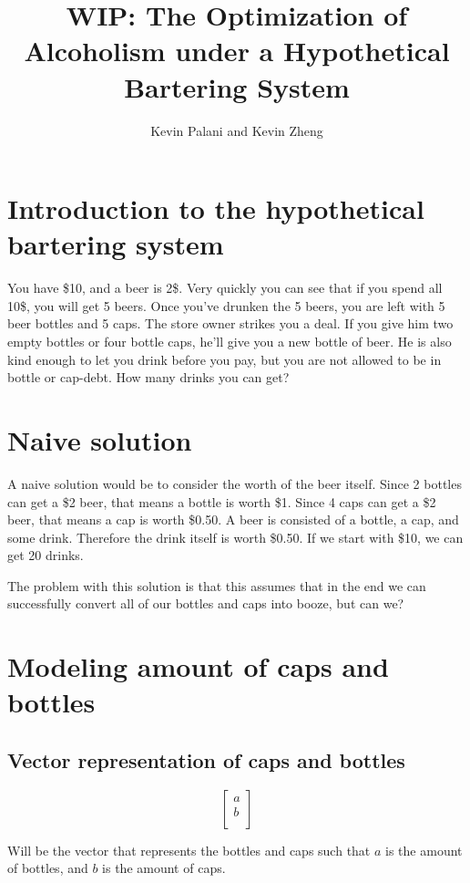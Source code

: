 \documentclass[letterpaper, 12pt]{article}
\title{WIP: The Optimization of Alcoholism under a Hypothetical Bartering System}
\author{Kevin Palani and Kevin Zheng}
\begin{document}
\maketitle
\tableofcontents
\lstset{
    breaklines=true
}
\section{Introduction to the hypothetical bartering system}
\par You have \$10, and a beer is 2\$.
Very quickly you can see that if you spend all 10\$, you will get 5 beers.
Once you've drunken the 5 beers, you are left with 5 beer bottles and 5 caps.
The store owner strikes you a deal.
If you give him two empty bottles or four bottle caps, he'll give you a new bottle of beer.
He is also kind enough to let you drink before you pay, but you are not allowed to be in bottle or cap-debt.
How many drinks you can get?
\section{Naive solution}
A naive solution would be to consider the worth of the beer itself.
Since 2 bottles can get a \$2 beer, that means a bottle is worth \$1.
Since 4 caps can get a \$2 beer, that means a cap is worth \$0.50.
A beer is consisted of a bottle, a cap, and some drink.
Therefore the drink itself is worth \$0.50.
If we start with \$10, we can get 20 drinks.

The problem with this solution is that this assumes that in the end we can successfully convert all of our bottles and caps into booze, but can we?
\section{Modeling amount of caps and bottles}
\subsection{Vector representation of caps and bottles}
\[
    \begin{bmatrix}
        a\\
        b\\
    \end{bmatrix}
\]
\par Will be the vector that represents the bottles and caps such that $a$ is the amount of bottles, and $b$ is the amount of caps.
\end{document}
